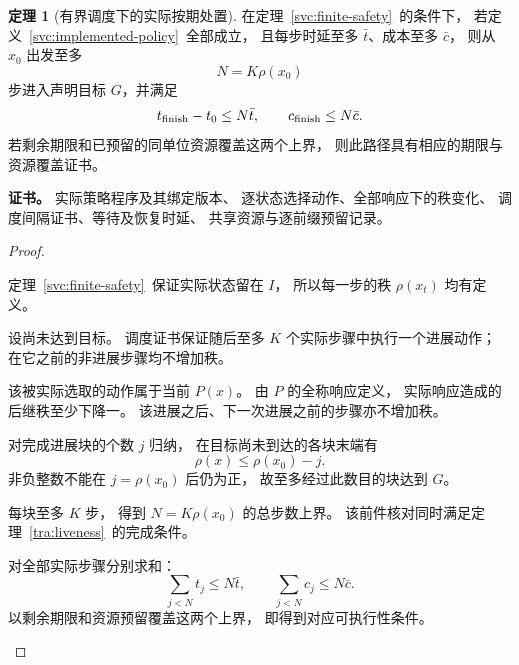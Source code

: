 \documentclass[UTF8,12pt,a4paper,openany,fontset=none,zihao=false]{ctexrep}
\theoremstyle{definition}
\newtheorem{theorem}{定理}[chapter]
\newenvironment{certificate}{\par\noindent\textbf{证书。}\ignorespaces}{\par}
\newcommand{\1}{\mathbf 1}
\begin{document}
\begin{theorem}[有界调度下的实际按期处置]
\label{svc:scheduled-completion}
在定理~\ref{svc:finite-safety}~的条件下，
若定义~\ref{svc:implemented-policy}~全部成立，
且每步时延至多 \(\bar t\)、成本至多 \(\bar c\)，
则从 \(x_0\) 出发至多
\[
N=K\rho(x_0)
\]
步进入声明目标 \(G\)，并满足
\[
t_{\rm finish}-t_0\le N\bar t,
\qquad
c_{\rm finish}\le N\bar c.
\]
若剩余期限和已预留的同单位资源覆盖这两个上界，
则此路径具有相应的期限与资源覆盖证书。
\end{theorem}
\begin{certificate}
实际策略程序及其绑定版本、
逐状态选择动作、全部响应下的秩变化、
调度间隔证书、等待及恢复时延、
共享资源与逐前缀预留记录。
\end{certificate}
\begin{proof}
\begin{semanticsteps}
\item 定理~\ref{svc:finite-safety}~保证实际状态留在 \(I\)，
所以每一步的秩 \(\rho(x_t)\) 均有定义。
\item 设尚未达到目标。
调度证书保证随后至多 \(K\) 个实际步骤中执行一个进展动作；
在它之前的非进展步骤均不增加秩。
\item 该被实际选取的动作属于当前 \(P(x)\)。
由 \(P\) 的全称响应定义，
实际响应造成的后继秩至少下降一。
该进展之后、下一次进展之前的步骤亦不增加秩。
\item 对完成进展块的个数 \(j\) 归纳，
在目标尚未到达的各块末端有
\[
\rho(x)\le\rho(x_0)-j.
\]
非负整数不能在 \(j=\rho(x_0)\) 后仍为正，
故至多经过此数目的块达到 \(G\)。
\item 每块至多 \(K\) 步，
得到 \(N=K\rho(x_0)\) 的总步数上界。
该前件核对同时满足定理~\ref{tra:liveness}~的完成条件。
\item 对全部实际步骤分别求和：
\[
\sum_{j<N}t_j\le N\bar t,\qquad
\sum_{j<N}c_j\le N\bar c.
\]
以剩余期限和资源预留覆盖这两个上界，
即得到对应可执行性条件。
\end{semanticsteps}
\end{proof}
\end{document}
